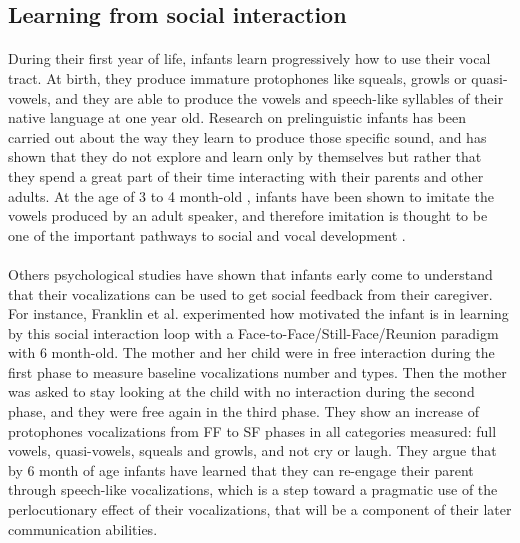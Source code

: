 \documentclass[12pt]{article}
\begin{document}

	\subsection{Learning from social interaction}

		\paragraph{}
		During their first year of life, infants learn progressively how to use their vocal tract. 
		At birth, they produce immature protophones like squeals, growls or quasi-vowels, and they are able to produce the vowels and speech-like syllables of their native language \cite{fenson1994variability} at one year old.
		Research on prelinguistic infants has been carried out about the way they learn to produce those specific sound, 
		and has shown that they do not explore and learn only by themselves but rather that they spend a great part of their time interacting with their parents and other adults.		
		At the age of 3 to 4 month-old \cite{kuhl1991}, infants have been shown to imitate the vowels produced by an adult speaker,
		and therefore imitation is thought to be one of the important pathways to social and vocal development \cite{meltzoff1999born}.				
			
		\paragraph{}
		Others psychological studies have shown that infants early come to understand that their vocalizations can be used to get social 
		feedback from their caregiver.
		For instance, Franklin et al. experimented how motivated the infant is in learning 
		by this social interaction loop \cite{franklin2014effects} with
		a Face-to-Face/Still-Face/Reunion paradigm with 6 month-old. 
		The mother and her child were in free interaction 
		during the first phase to measure baseline vocalizations number and types. 
		Then the mother was asked to stay looking at the child with no interaction during the second phase, and they were free again in the third phase.
		They show an increase of protophones vocalizations from FF to SF phases in all categories measured: full vowels, quasi-vowels, squeals and growls, 
		and not cry or laugh. 
		They argue that by 6 month of age infants have learned that they can re-engage their parent through speech-like vocalizations, which is a step 
		toward a pragmatic use of the perlocutionary effect of their vocalizations, that will be a component of their later communication abilities.
		
\end{document}

